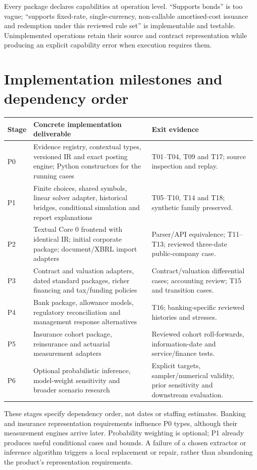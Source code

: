 Every package declares capabilities at operation level. ``Supports bonds'' is
too vague; ``supports fixed-rate, single-currency, non-callable amortised-cost
issuance and redemption under this reviewed rule set'' is implementable and
testable. Unimplemented operations retain their source and contract
representation while producing an explicit capability error when execution
requires them.

\section{Implementation milestones and dependency order}

\begin{longtable}{L{16mm}L{76mm}L{44mm}}
\toprule Stage & Concrete implementation deliverable & Exit evidence\\\midrule\endhead
P0 & Evidence registry, contextual types, versioned IR and exact posting engine;
Python constructors for the running cases & T01--T04, T09 and T17; source
inspection and replay.\\
P1 & Finite choices, shared symbols, linear solver adapter, historical bridges,
conditional simulation and report explanations & T05--T10, T14 and T18;
synthetic family preserved.\\
P2 & Textual Core 0 frontend with identical IR; initial corporate package;
document/XBRL import adapters & Parser/API equivalence; T11--T13; reviewed
three-date public-company case.\\
P3 & Contract and valuation adapters, dated standard packages, richer financing
and tax/funding policies & Contract/valuation differential cases; accounting
review; T15 and transition cases.\\
P4 & Bank package, allowance models, regulatory reconciliation and management
response alternatives & T16; banking-specific reviewed histories and stresses.\\
P5 & Insurance cohort package, reinsurance and actuarial measurement adapters &
Reviewed cohort roll-forwards, information-date and service/finance tests.\\
P6 & Optional probabilistic inference, model-weight sensitivity and broader
scenario research & Explicit targets, sampler/numerical validity, prior
sensitivity and downstream evaluation.\\\bottomrule
\end{longtable}

These stages specify dependency order, not dates or staffing estimates.
Banking and insurance representation requirements influence P0 types, although
their measurement engines arrive later. Probability weighting is optional;
P1 already produces useful conditional cases and bounds. A failure of a chosen
extractor or inference algorithm triggers a local replacement or repair,
rather than abandoning the product's representation requirements.

